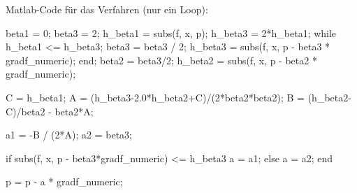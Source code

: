   Matlab-Code für das Verfahren (nur ein Loop):
  \begin{MatlabCode}
    beta1 = 0;
    beta3 = 2; %
    h_beta1 = subs(f, x, p);
    h_beta3 = 2*h_beta1; %
    while h_beta1 <= h_beta3;
        beta3 = beta3 / 2;
        h_beta3 = subs(f, x, p - beta3 * gradf_numeric);
    end;
    beta2 = beta3/2;
    h_beta2 = subs(f, x, p - beta2 * gradf_numeric);

    C = h_beta1;
    A = (h_beta3-2.0*h_beta2+C)/(2*beta2*beta2);
    B = (h_beta2-C)/beta2 - beta2*A;
 
    a1 = -B / (2*A);
    a2 = beta3;
    
    if subs(f, x, p - beta3*gradf_numeric) <= h_beta3 
        a = a1;
    else
        a = a2;
    end
    
    
    p = p - a * gradf_numeric;
  \end{MatlabCode}
  
